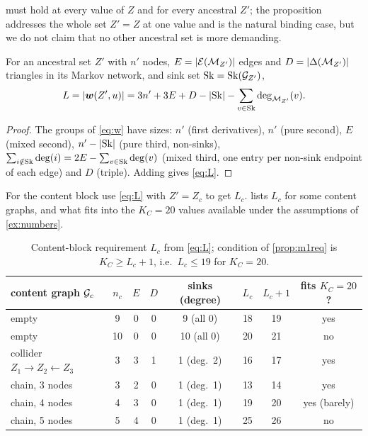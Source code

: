  must hold at every value of $Z$ and for every ancestral $Z'$; the proposition addresses the
whole set $Z'=Z$ at one value and is the natural binding case, but we do not claim that no other ancestral set
is more demanding.

\begin{proposition}\label{prop:count}
For an ancestral set $Z'$ with $n'$ nodes, $E=|\mathcal{E}(\mathcal{M}_{Z'})|$ edges and $D=|\Delta(\mathcal{M}_{Z'})|$
triangles in its Markov network, and sink set $\mathrm{Sk}=\mathrm{Sk}(\mathcal{G}_{Z'})$,
\begin{equation}
L=|\boldsymbol{w}(Z',u)|=3n'+3E+D-|\mathrm{Sk}|-\sum_{v\in\mathrm{Sk}}\deg_{\mathcal{M}_{Z'}}(v).
\label{eq:L}
\end{equation}
\end{proposition}

\begin{proof}
The groups of \cref{eq:w} have sizes: $n'$ (first derivatives), $n'$ (pure second), $E$ (mixed
second), $n'-|\mathrm{Sk}|$ (pure third, non-sinks), $\sum_{i\notin\mathrm{Sk}}\deg(i)=2E-\sum_{v\in\mathrm{Sk}}\deg(v)$ (mixed
third, one entry per non-sink endpoint of each edge) and $D$ (triple). Adding gives \cref{eq:L}.
\end{proof}

For the content block use \cref{eq:L} with $Z'=Z_c$ to get $L_c$.  lists
$L_c$ for some content graphs, and what fits into the $K_C=20$ values available under the assumptions of
\cref{ex:numbers}.

\begin{table}[ht]
\centering
\caption{Content-block requirement $L_c$ from \cref{eq:L}; condition  of
\cref{prop:m1req} is $K_C\ge L_c+1$, i.e.\ $L_c\le 19$ for $K_C=20$.}
\label{tab:examples}
\begin{tabular}{@{}lccccccc@{}}
\toprule
content graph $\mathcal{G}_c$ & $n_c$ & $E$ & $D$ & sinks (degree) & $L_c$ & $L_c+1$ & fits $K_C{=}20$?\\
\midrule
empty                              & 9 & 0 & 0 & 9 (all 0) & 18 & 19 & yes\\
empty                              & 10 & 0 & 0 & 10 (all 0) & 20 & 21 & no\\
collider $Z_1\to Z_2\leftarrow Z_3$ & 3 & 3 & 1 & 1 (deg.\ 2) & 16 & 17 & yes\\
chain, 3 nodes                     & 3 & 2 & 0 & 1 (deg.\ 1) & 13 & 14 & yes\\
chain, 4 nodes                     & 4 & 3 & 0 & 1 (deg.\ 1) & 19 & 20 & yes (barely)\\
chain, 5 nodes                     & 5 & 4 & 0 & 1 (deg.\ 1) & 25 & 26 & no\\
\bottomrule
\end{tabular}
\end{table}

